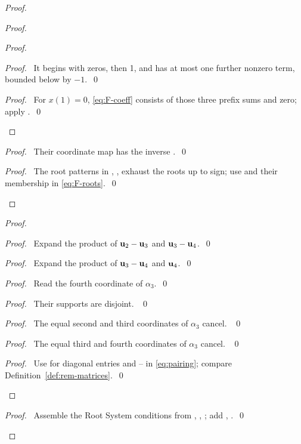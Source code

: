 \begin{proof}
\begin{proof}
\begin{proof}
\begin{proof}\pf\ It begins with zeros, then 1, and has at most one
further nonzero term, bounded below by $-1$.~\qed\end{proof}
\qedstep
\begin{proof}\pf\ For $x(1)=0$, \eqref{eq:F-coeff} consists of those
three prefix sums and zero; apply .~\qed\end{proof}
\end{proof}
\begin{proof}\pf\ Their coordinate map has the inverse .~\qed\end{proof}
\qedstep
\begin{proof}\pf\ The root patterns in ,
,  exhaust the roots up to sign;
use  and their membership in \eqref{eq:F-roots}.~\qed\end{proof}
\end{proof}
\begin{proof}
\begin{proof}\pf\ Expand the product of ${\mathbf u}_2-{\mathbf u}_3$ and ${\mathbf u}_3-{\mathbf u}_4$.~\qed\end{proof}
\begin{proof}\pf\ Expand the product of ${\mathbf u}_3-{\mathbf u}_4$ and ${\mathbf u}_4$.~\qed\end{proof}
\begin{proof}\pf\ Read the fourth coordinate of $\alpha_3$.~\qed\end{proof}
\begin{proof}\pf\ Their supports are disjoint. ~\qed\end{proof}
\begin{proof}\pf\ The equal second and third coordinates of $\alpha_3$
cancel. ~\qed\end{proof}
\begin{proof}\pf\ The equal third and fourth coordinates of $\alpha_3$
cancel. ~\qed\end{proof}
\qedstep
\begin{proof}\pf\ Use  for diagonal entries and
-- in \eqref{eq:pairing};
compare Definition~\ref{def:rem-matrices}.~\qed\end{proof}
\end{proof}
\qedstep
\begin{proof}\pf\ Assemble the Root System conditions from
, , ;
add , .~\qed\end{proof}
\end{proof}

